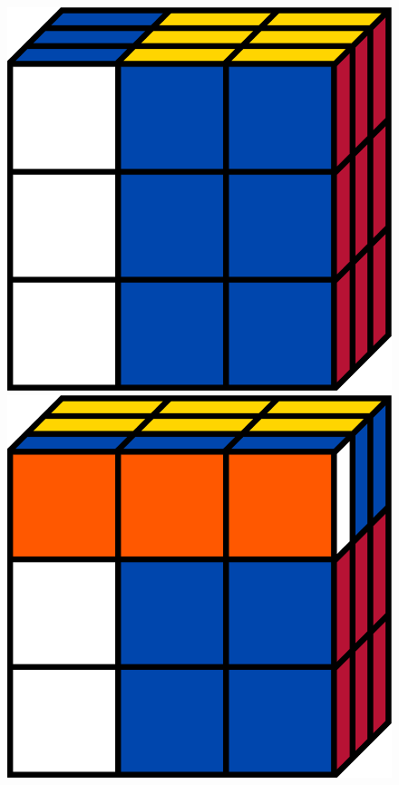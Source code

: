 \documentclass[12pt]{article}
\begin{document}
\begin{figure}[h]
    \centering
    \begin{minipage}[c]{0.2\textwidth}
        \includegraphics[scale=0.1]{moves/cubeLp.png}
    \end{minipage}
    \begin{minipage}[c]{0.05\textwidth}
        \centering
    \end{minipage}
    \hspace{0.5cm}
    \begin{minipage}[c]{0.2\textwidth}
        \includegraphics[scale=0.1]{moves/cubeLpUp.png}

\end{minipage}
\end{figure}
\end{document}
